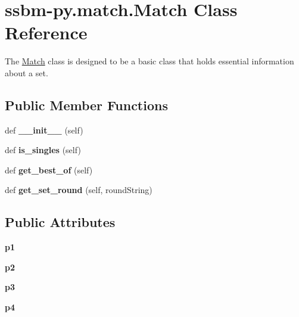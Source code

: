 \hypertarget{classssbm-py_1_1match_1_1_match}{}\section{ssbm-\/py.match.\+Match Class Reference}
\label{classssbm-py_1_1match_1_1_match}


The \hyperlink{classssbm-py_1_1match_1_1_match}{Match} class is designed to be a basic class that holds essential information about a set.  


\subsection*{Public Member Functions}
\begin{DoxyCompactItemize}
\item 
\mbox{\label{classssbm-py_1_1match_1_1_match_af9976cfb563fc57b35f8fdde1485daa7}} 
def {\bfseries \+\_\+\+\_\+init\+\_\+\+\_\+} (self)
\item 
\mbox{\label{classssbm-py_1_1match_1_1_match_a437a1c291dc23588076add106dcb787b}} 
def {\bfseries is\+\_\+singles} (self)
\item 
\mbox{\label{classssbm-py_1_1match_1_1_match_abc1ed5b3ce5ad859ce6f0efe4c53b0c4}} 
def {\bfseries get\+\_\+best\+\_\+of} (self)
\item 
\mbox{\label{classssbm-py_1_1match_1_1_match_a18175053d9524487015791fb487c970f}} 
def {\bfseries get\+\_\+set\+\_\+round} (self, round\+String)
\end{DoxyCompactItemize}
\subsection*{Public Attributes}
\begin{DoxyCompactItemize}
\item 
\mbox{\label{classssbm-py_1_1match_1_1_match_aaaf2fedffbc05943a41d2e9b41615962}} 
{\bfseries p1}
\item 
\mbox{\label{classssbm-py_1_1match_1_1_match_a8eb30b0ba00718cc98fc8d92201afe76}} 
{\bfseries p2}
\item 
\mbox{\label{classssbm-py_1_1match_1_1_match_a8b90dbe7ecd7a53e41f7b4dae732fc48}} 
{\bfseries p3}
\item 
\mbox{\label{classssbm-py_1_1match_1_1_match_aaa86023f820f2a4a211a0b54f15a5508}} 
{\bfseries p4}
\end{DoxyCompactItemize}


